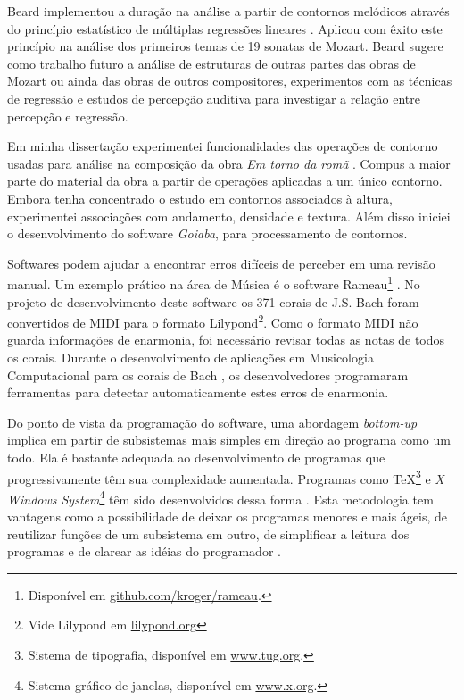\documentclass[12pt]{article}
\newcommand{\eng}[1]{\textit{#1}}
\newcommand{\goiaba}[0]{\textit{Goiaba}}
\newcommand{\obra}[0]{\textit{Em torno da romã}}
\begin{document}

Beard implementou a duração na análise a partir de contornos melódicos
através do princípio estatístico de múltiplas regressões lineares
\cite{beard03:contour}. Aplicou com êxito este princípio na análise
dos primeiros temas de 19 sonatas de Mozart. Beard sugere como
trabalho futuro a análise de estruturas de outras partes das obras de
Mozart ou ainda das obras de outros compositores, experimentos com as
técnicas de regressão e estudos de percepção auditiva para investigar
a relação entre percepção e regressão.


Em minha dissertação experimentei funcionalidades das operações de
contorno usadas para análise na composição da obra \obra{}
\cite{sampaio08:em}. Compus a maior parte do material da obra a partir
de operações aplicadas a um único contorno. Embora tenha concentrado o
estudo em contornos associados à altura, experimentei associações com
andamento, densidade e textura. Além disso iniciei o desenvolvimento
do software \goiaba{}, para processamento de contornos.



Softwares podem ajudar a encontrar erros difíceis de perceber em uma
revisão manual. Um exemplo prático na área de Música é o software
Rameau\footnote{Disponível em \url{github.com/kroger/rameau}.}
\cite{kroger08:rameau,passos.ea09:functional}. No projeto de
desenvolvimento deste software os 371 corais de J.S. Bach foram
convertidos de MIDI para o formato Lilypond\footnote{Vide Lilypond em
  \url{lilypond.org}}. Como o formato MIDI não guarda informações de
enarmonia, foi necessário revisar todas as notas de todos os
corais. Durante o desenvolvimento de aplicações em Musicologia
Computacional para os corais de Bach \cite{kroger08:musicologia}, os
desenvolvedores programaram ferramentas para detectar automaticamente
estes erros de enarmonia.

Do ponto de vista da programação do software, uma abordagem
\eng{bottom-up} implica em partir de subsistemas mais simples em
direção ao programa como um todo. Ela é bastante adequada ao
desenvolvimento de programas que progressivamente têm sua complexidade
aumentada. Programas como \TeX{}\footnote{Sistema de tipografia,
  disponível em \url{www.tug.org}.} e \eng{X Windows
  System}\footnote{Sistema gráfico de janelas, disponível em
  \url{www.x.org}.} têm sido desenvolvidos dessa forma
\cite[p. vi]{graham94:lisp}. Esta metodologia tem vantagens como a
possibilidade de deixar os programas menores e mais ágeis, de
reutilizar funções de um subsistema em outro, de simplificar a leitura
dos programas e de clarear as idéias do programador
\cite[p. 4]{graham94:lisp}.
\end{document}
